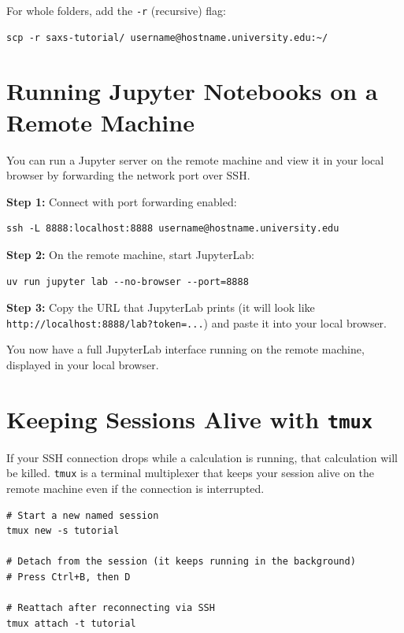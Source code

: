 \documentclass[nobib]{tufte-book}
\begin{document}
For whole folders, add the \texttt{-r} (recursive) flag:

\begin{lstlisting}[style=bashstyle]
scp -r saxs-tutorial/ username@hostname.university.edu:~/
\end{lstlisting}

\section{Running Jupyter Notebooks on a Remote Machine}

You can run a Jupyter server on the remote machine and view it in your
local browser by forwarding the network port over SSH.

\medskip
\noindent\textbf{Step 1:} Connect with port forwarding enabled:

\begin{lstlisting}[style=bashstyle]
ssh -L 8888:localhost:8888 username@hostname.university.edu
\end{lstlisting}

\noindent\textbf{Step 2:} On the remote machine, start JupyterLab:

\begin{lstlisting}[style=bashstyle]
uv run jupyter lab --no-browser --port=8888
\end{lstlisting}

\noindent\textbf{Step 3:} Copy the URL that JupyterLab prints (it will
look like \texttt{http://localhost:8888/lab?token=...}) and paste it
into your local browser.

You now have a full JupyterLab interface running on the remote machine,
displayed in your local browser.

\section{Keeping Sessions Alive with \texttt{tmux}}

If your SSH connection drops while a calculation is running, that
calculation will be killed.
\texttt{tmux} is a terminal multiplexer that keeps your session alive on the
remote machine even if the connection is interrupted.

\begin{lstlisting}[style=bashstyle]
# Start a new named session
tmux new -s tutorial

# Detach from the session (it keeps running in the background)
# Press Ctrl+B, then D

# Reattach after reconnecting via SSH
tmux attach -t tutorial
\end{lstlisting}
\end{document}
